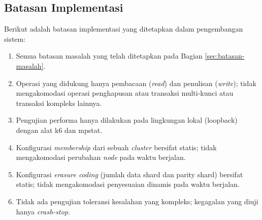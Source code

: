 \subsection{Batasan Implementasi}
\label{subsection:batasan-implementasi}

Berikut adalah batasan implementasi yang ditetapkan dalam pengembangan sistem:
\begin{enumerate}
  \item Semua batasan masalah yang telah ditetapkan pada Bagian \ref{sec:batasan-masalah}.
  \item Operasi yang didukung hanya pembacaan (\textit{read}) dan penulisan (\textit{write}); tidak mengakomodasi operasi penghapusan atau transaksi multi-kunci atau transaksi kompleks lainnya.
  \item Pengujian performa hanya dilakukan pada lingkungan lokal (loopback) dengan alat k6 dan mpstat.
  \item Konfigurasi \textit{membership} dari sebuah \textit{cluster} bersifat statis; tidak mengakomodasi perubahan \textit{node} pada waktu berjalan.
  \item Konfigurasi \textit{erasure coding} (jumlah data shard dan parity shard) bersifat statis; tidak mengakomodasi penyesuaian dinamis pada waktu berjalan.
  \item Tidak ada pengujian toleransi kesalahan yang kompleks; kegagalan yang diuji hanya \textit{crash-stop}.
\end{enumerate}

